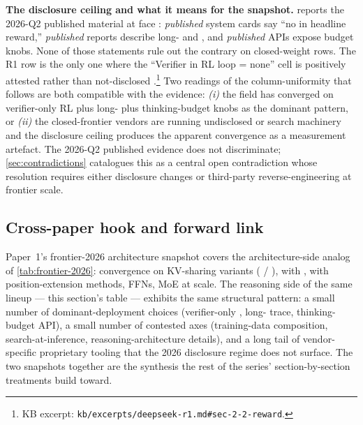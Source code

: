 \begin{contradiction}
\textbf{The disclosure ceiling and what it means for the snapshot.}
 reports the 2026-Q2 published material at
face : \emph{published} system cards say ``no  in headline
reward,'' \emph{published} reports describe long- and , and
\emph{published} APIs expose budget knobs. None of those statements
rule out the contrary on closed-weight rows. The R1 row is the only
one where the ``Verifier in RL loop = none'' cell is positively
attested rather than not-disclosed
\citep[\S 2.2]{deepseek-r1}.\footnote{KB excerpt:
\nolinkurl{kb/excerpts/deepseek-r1.md#sec-2-2-reward}.} Two readings of
the column-uniformity that follows are both compatible with the
evidence: \emph{(i)} the field has converged on verifier-only RL plus
long- plus thinking-budget knobs as the dominant pattern, or
\emph{(ii)} the closed-frontier vendors are running undisclosed 
or search machinery and the disclosure ceiling produces the apparent
convergence as a measurement artefact. The 2026-Q2 published evidence
does not discriminate; \cref{sec:contradictions} catalogues this as a
central open contradiction whose resolution requires either
disclosure changes or third-party reverse-engineering at frontier
scale.
\end{contradiction}

\subsection{Cross-paper hook and forward link}
\label{sec:frontier-forward}

Paper~1's frontier-2026 architecture snapshot covers the
architecture-side analog of \cref{tab:frontier-2026}: convergence on
KV-sharing variants ( / ),  with ,  with
position-extension methods,  FFNs, MoE at scale. The reasoning
side of the same lineup --- this section's table --- exhibits the same
structural pattern: a small number of dominant-deployment choices
(verifier-only , long- trace, thinking-budget API), a small
number of contested axes (training-data composition, search-at-inference,
reasoning-architecture details), and a long tail of vendor-specific
proprietary tooling that the 2026 disclosure regime does not surface.
The two snapshots together are the synthesis the rest of the series'
section-by-section treatments build toward.


